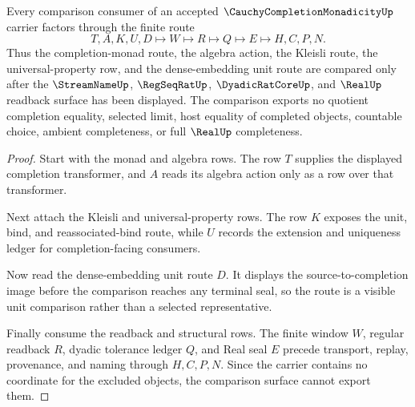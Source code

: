 \begin{theorem}
\label{thm:cauchy-completion-monadicity-comparison-surface}
Every comparison consumer of an accepted $\CauchyCompletionMonadicityUp$ carrier factors through the finite route
$$
T,A,K,U,D \longmapsto W \longmapsto R \longmapsto Q \longmapsto E \longmapsto H,C,P,N .
$$
Thus the completion-monad route, the algebra action, the Kleisli route, the universal-property row, and the dense-embedding unit route are compared only after the $\StreamNameUp$, $\RegSeqRatUp$, $\DyadicRatCoreUp$, and $\RealUp$ readback surface has been displayed. The comparison exports no quotient completion equality, selected limit, host equality of completed objects, countable choice, ambient completeness, or full $\RealUp$ completeness.
\end{theorem}
\begin{proof}
Start with the monad and algebra rows. The row $T$ supplies the displayed completion transformer, and $A$ reads its algebra action only as a row over that transformer.

Next attach the Kleisli and universal-property rows. The row $K$ exposes the unit, bind, and reassociated-bind route, while $U$ records the extension and uniqueness ledger for completion-facing consumers.

Now read the dense-embedding unit route $D$. It displays the source-to-completion image before the comparison reaches any terminal seal, so the route is a visible unit comparison rather than a selected representative.

Finally consume the readback and structural rows. The finite window $W$, regular readback $R$, dyadic tolerance ledger $Q$, and Real seal $E$ precede transport, replay, provenance, and naming through $H,C,P,N$. Since the carrier contains no coordinate for the excluded objects, the comparison surface cannot export them.
\end{proof}


